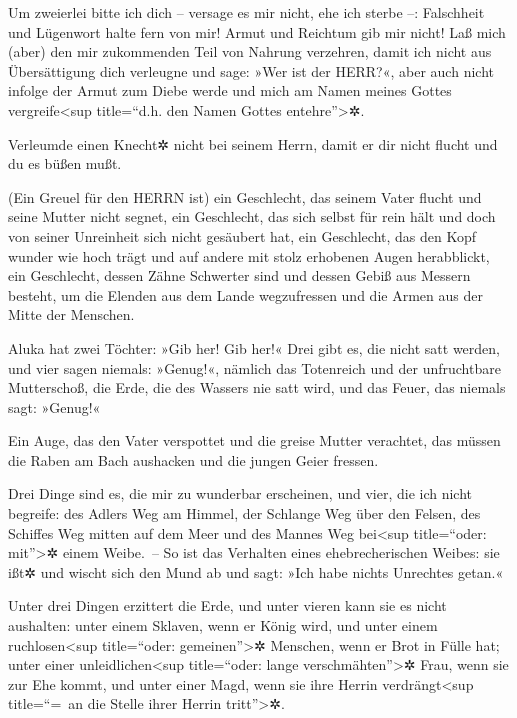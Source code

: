 Um zweierlei bitte ich dich -- versage es mir nicht, ehe
ich sterbe --: Falschheit und Lügenwort halte fern von
mir! Armut und Reichtum gib mir nicht! Laß mich (aber) den mir
zukommenden Teil von Nahrung verzehren, damit ich nicht
aus Übersättigung dich verleugne und sage: »Wer ist der HERR?«, aber
auch nicht infolge der Armut zum Diebe werde und mich am Namen meines
Gottes vergreife\textless sup title=``d.h. den Namen Gottes
entehre''\textgreater✲.

Verleumde einen Knecht✲ nicht bei seinem Herrn, damit er
dir nicht flucht und du es büßen mußt.

(Ein Greuel für den HERRN ist) ein Geschlecht, das seinem
Vater flucht und seine Mutter nicht segnet, ein
Geschlecht, das sich selbst für rein hält und doch von seiner Unreinheit
sich nicht gesäubert hat, ein Geschlecht, das den Kopf
wunder wie hoch trägt und auf andere mit stolz erhobenen Augen
herabblickt, ein Geschlecht, dessen Zähne Schwerter sind
und dessen Gebiß aus Messern besteht, um die Elenden aus dem Lande
wegzufressen und die Armen aus der Mitte der Menschen.

Aluka hat zwei Töchter: »Gib her! Gib her!« Drei gibt es,
die nicht satt werden, und vier sagen niemals: »Genug!«,
nämlich das Totenreich und der unfruchtbare Mutterschoß,
die Erde, die des Wassers nie satt wird, und das Feuer, das niemals
sagt: »Genug!«

Ein Auge, das den Vater verspottet und die greise Mutter
verachtet, das müssen die Raben am Bach aushacken und die jungen Geier
fressen.

Drei Dinge sind es, die mir zu wunderbar erscheinen, und
vier, die ich nicht begreife: des Adlers Weg am Himmel,
der Schlange Weg über den Felsen, des Schiffes Weg mitten auf dem Meer
und des Mannes Weg bei\textless sup title=``oder: mit''\textgreater✲
einem Weibe.~-- So ist das Verhalten eines
ehebrecherischen Weibes: sie ißt✲ und wischt sich den Mund ab und sagt:
»Ich habe nichts Unrechtes getan.«

Unter drei Dingen erzittert die Erde, und unter vieren
kann sie es nicht aushalten: unter einem Sklaven, wenn er
König wird, und unter einem ruchlosen\textless sup title=``oder:
gemeinen''\textgreater✲ Menschen, wenn er Brot in Fülle hat;
unter einer unleidlichen\textless sup title=``oder: lange
verschmähten''\textgreater✲ Frau, wenn sie zur Ehe kommt, und unter
einer Magd, wenn sie ihre Herrin verdrängt\textless sup title=``=~an die
Stelle ihrer Herrin tritt''\textgreater✲.

